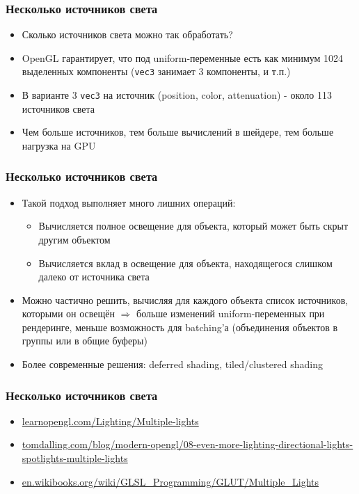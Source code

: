\documentclass{beamer}
\begin{document}
\begin{frame}[fragile]
\frametitle{Несколько источников света}
\begin{itemize}
\item Сколько источников света можно так обработать?
\pause
\item OpenGL гарантирует, что под uniform-переменные есть как минимум 1024 выделенных компоненты (\verb|vec3| занимает 3 компоненты, и т.п.)
\pause
\item В варианте 3 \verb|vec3| на источник (position, color, attenuation) - около 113 источников света
\pause
\item Чем больше источников, тем больше вычислений в шейдере, тем больше нагрузка на GPU
\end{itemize}
\end{frame}

\begin{frame}[fragile]
\frametitle{Несколько источников света}
\begin{itemize}
\item Такой подход выполняет много лишних операций:
\begin{itemize}
\item Вычисляется полное освещение для объекта, который может быть скрыт другим объектом
\pause
\item Вычисляется вклад в освещение для объекта, находящегося слишком далеко от источника света
\end{itemize}
\pause
\item Можно частично решить, вычисляя для каждого объекта список источников, которыми он освещён \begin{math}\Rightarrow\end{math} больше изменений uniform-переменных при рендеринге, меньше возможность для batching'а (объединения объектов в группы или в общие буферы)
\pause
\item Более современные решения: deferred shading, tiled/clustered shading
\end{itemize}
\end{frame}

\begin{frame}[fragile]
\frametitle{Несколько источников света}
\begin{itemize}
\item \href{https://learnopengl.com/Lighting/Multiple-lights}{learnopengl.com/Lighting/Multiple-lights}
\item \href{https://www.tomdalling.com/blog/modern-opengl/08-even-more-lighting-directional-lights-spotlights-multiple-lights}{tomdalling.com/blog/modern-opengl/08-even-more-lighting-directional-lights-spotlights-multiple-lights}
\item \href{https://en.wikibooks.org/wiki/GLSL_Programming/GLUT/Multiple_Lights}{en.wikibooks.org/wiki/GLSL\_Programming/GLUT/Multiple\_Lights}
\end{itemize}
\end{frame}
\end{document}
